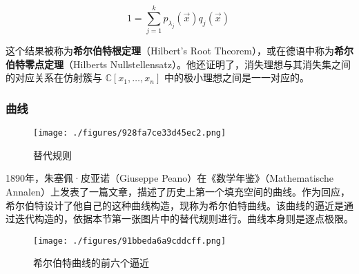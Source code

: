 \[
1 = \sum_{j=1}^{k} p_{\lambda_j}(\vec{x}) q_j(\vec{x})~
\]

这个结果被称为\textbf{希尔伯特根定理}（Hilbert's Root Theorem），或在德语中称为\textbf{希尔伯特零点定理}（Hilberts Nullstellensatz）。他还证明了，消失理想与其消失集之间的对应关系在仿射簇与 \( \mathbb{C}[x_1, \dots, x_n] \) 中的极小理想之间是一一对应的。
\subsubsection{曲线}
\begin{figure}[ht]
\centering
\texttt{[image: ./figures/928fa7ce33d45ec2.png]}
\caption{替代规则} \label{fig_David_9}
\end{figure}
1890年，朱塞佩·皮亚诺（Giuseppe Peano）在《数学年鉴》（Mathematische Annalen）上发表了一篇文章，描述了历史上第一个填充空间的曲线。作为回应，希尔伯特设计了他自己的这种曲线构造，现称为希尔伯特曲线。该曲线的逼近是通过迭代构造的，依据本节第一张图片中的替代规则进行。曲线本身则是逐点极限。
\begin{figure}[ht]
\centering
\texttt{[image: ./figures/91bbeda6a9cddcff.png]}
\caption{希尔伯特曲线的前六个逼近} \label{fig_David_10}
\end{figure}